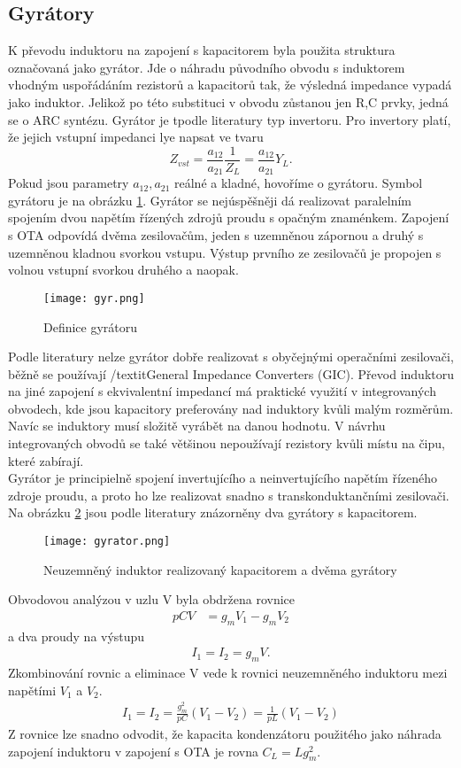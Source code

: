 \subsection{Gyrátory}\label{s:GYR}
\noindent K převodu induktoru na zapojení s kapacitorem byla použita struktura označovaná jako gyrátor. Jde o náhradu původního obvodu s induktorem vhodným uspořádáním rezistorů a kapacitorů tak, že výsledná impedance vypadá jako induktor. Jelikož po této substituci v obvodu zůstanou jen R,C prvky, jedná se o ARC syntézu.  Gyrátor je tpodle literatury \cite{10} typ invertoru. Pro invertory platí, že jejich vstupní impedanci lye napsat ve tvaru\begin{equation}
Z_{vst} = \frac{a_{12}}{a_{21}}\frac{1}{Z_L} = \frac{a_{12}}{a_{21}}Y_L.
\end{equation}
Pokud jsou parametry $a_{12}, a_{21}$ reálné a kladné, hovoříme o gyrátoru. Symbol gyrátoru je na obrázku \ref{s:G}. Gyrátor se nejúspěšněji dá realizovat paralelním spojením dvou napětím řízených zdrojů proudu s opačným znaménkem. Zapojení s OTA odpovídá dvěma zesilovačům, jeden s uzemněnou zápornou a druhý s uzemněnou kladnou svorkou vstupu. Výstup prvního ze zesilovačů je propojen s volnou vstupní svorkou druhého a naopak.
\begin{figure}[h]
\centering
\texttt{[image: gyr.png]}
\caption{Definice gyrátoru \label{s:G}}
\end{figure}
Podle literatury \cite{18} nelze gyrátor dobře realizovat s obyčejnými operačními zesilovači, běžně se používají /textit{General Impedance Converters (GIC)}. Převod induktoru na jiné zapojení s ekvivalentní impedancí má praktické využití v integrovaných obvodech, kde jsou kapacitory preferovány nad induktory kvůli malým rozměrům. Navíc se induktory musí složitě vyrábět na danou hodnotu. V návrhu integrovaných obvodů se také většinou nepoužívají rezistory kvůli místu na čipu, které zabírají. \\
Gyrátor je principielně spojení invertujícího a neinvertujícího napětím řízeného zdroje proudu, a proto ho lze realizovat snadno s transkonduktančními zesilovači. Na obrázku \ref{s:GO} jsou podle literatury \cite{18} znázorněny dva gyrátory s kapacitorem. 
\begin{figure}[h]
\centering
\texttt{[image: gyrator.png]}
\caption[Neuzemněný induktor realizovaný kapacitorem a dvěma gyrátory]{Neuzemněný induktor realizovaný kapacitorem a dvěma gyrátory \label{s:GO}}
\end{figure}
Obvodovou analýzou v uzlu V byla obdržena rovnice
\begin{align}
pCV &= g_mV_1 - g_mV_2
\end{align}
a dva proudy na výstupu
\begin{align}
I_1 = I_2 = g_mV.
\end{align}
Zkombinování rovnic a eliminace V vede k rovnici neuzemněného induktoru mezi napětími $V_1$ a $V_2$.
\begin{align}
I_1 = I_2 = \frac{g_m^2}{pC}(V_1 - V_2) = \frac{1}{pL}(V_1 - V_2)
\end{align}
Z rovnice lze snadno odvodit, že kapacita kondenzátoru použitého jako náhrada zapojení induktoru v zapojení s OTA je rovna $C_L = L g_m ^2$. \\
